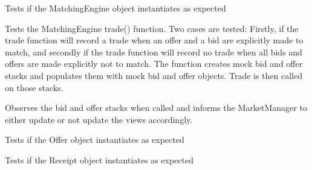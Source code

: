 \begin{DoxyRefList}
\item[\label{todo__todo000016}%
\hypertarget{todo__todo000016}{}%
Member \hyperlink{class_market_strategy_unit_test_ac701e483e622d7a918f1b8f21f024108}{Market\+Strategy\+Unit\+Test.set\+Strategy\+Test} ()]
\item[\label{todo__todo000018}%
\hypertarget{todo__todo000018}{}%
Member \hyperlink{class_matching_engine_unit_test_acbb8d543a15e349d8f46769388fd28bd}{Matching\+Engine\+Unit\+Test.instantiation} ()]Tests if the Matching\+Engine object instantiates as expected  
\item[\label{todo__todo000019}%
\hypertarget{todo__todo000019}{}%
Member \hyperlink{class_matching_engine_unit_test_a2dbbdf5632bac8d35d6902caf5556c5f}{Matching\+Engine\+Unit\+Test.trade\+Test} ()]Tests the Matching\+Engine trade() function. Two cases are tested\+: Firstly, if the trade function will record a trade when an offer and a bid are explicitly made to match, and secondly if the trade function will record no trade when all bids and offers are made explicitly not to match. The function creates mock bid and offer stacks and populates them with mock bid and offer objects. Trade is then called on those stacks.  
\item[\label{todo__todo000020}%
\hypertarget{todo__todo000020}{}%
Member \hyperlink{class_matching_engine_unit_test_a914f15f54087d84798e02b33734a9791}{Matching\+Engine\+Unit\+Test.update\+Test} ()]Observes the bid and offer stacks when called and informs the Market\+Manager to either update or not update the views accordingly.  
\item[\label{todo__todo000021}%
\hypertarget{todo__todo000021}{}%
Member \hyperlink{class_offer_unit_test_a6a183dfb778383f20231c0dd4a43dc65}{Offer\+Unit\+Test.instantiation} ()]Tests if the Offer object instantiates as expected  
\item[\label{todo__todo000022}%
\hypertarget{todo__todo000022}{}%
Member \hyperlink{class_receipt_unit_test_aab92fcc0a866db8ec56ed65b9693cdc8}{Receipt\+Unit\+Test.instantiation} ()]Tests if the Receipt object instantiates as expected 
\end{DoxyRefList}